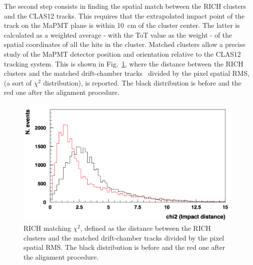 \documentclass[5p,times,twocolumn]{elsarticle}
\def\MaPMT{MaPMT }
\begin{document}

The second step consists in finding the spatial match between the RICH clusters and the CLAS12 tracks. This requires
that the extrapolated impact point of the track on the MaPMT plane is within 10~cm of the cluster center. The latter
is calculated as a weighted average - with the ToT value as the weight - of the spatial coordinates of all the hits in the
cluster. Matched clusters allow a precise study of the MaPMT detector position and orientation relative to the CLAS12
tracking system. This is shown in Fig.~\ref{Fig:DCmatch}, where the distance between the RICH clusters and the matched 
drift-chamber tracks~\cite{REF:dc-nim} divided by the pixel spatial RMS, (a sort of $\chi^2$ distribution), is reported. The black
distribution is before and the red one after the alignment procedure.

\begin{figure}[t]
\begin{center}
\includegraphics[width=1.0\columnwidth]{ckmaca.png}
\end{center}
\caption{RICH matching $\chi^2$, defined as the distance between the RICH clusters and the matched drift-chamber tracks divided by the
  pixel spatial RMS. The black distribution is before and the red one after the alignment procedure.}
\label{Fig:DCmatch}
\end{figure}
\end{document}
